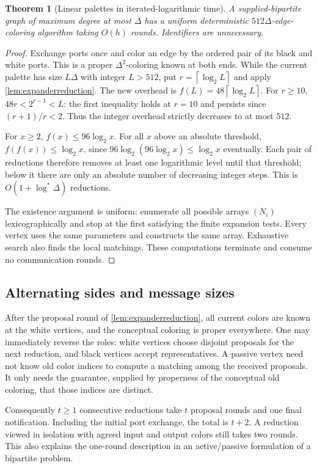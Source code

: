 \documentclass[11pt]{article}
\newtheorem{theorem}{Theorem}[section]
\theoremstyle{definition}
\theoremstyle{remark}
\newcommand{\ceil}[1]{\left\lceil #1\right\rceil}
\newcommand{\logstar}{\log^*}
\begin{document}
\begin{theorem}[Linear palettes in iterated-logarithmic time]\label{thm:linearordinary}
A supplied-bipartite graph of maximum degree at most $\Delta$ has a
uniform deterministic $512\Delta$-edge-coloring algorithm taking $O(h)$
rounds. Identifiers are unnecessary.
\end{theorem}
\begin{proof}
Exchange ports once and color an edge by the ordered pair of its black
and white ports. This is a proper $\Delta^2$-coloring known at both ends.
While the current palette has size $L\Delta$ with integer $L>512$, put
$r=\ceil{\log_2 L}$ and apply \cref{lem:expanderreduction}. The new
overhead is $f(L)=48\ceil{\log_2 L}$. For $r\ge10$,
$48r<2^{r-1}<L$: the first inequality holds at $r=10$ and persists since
$(r+1)/r<2$. Thus the integer overhead strictly decreases to at most $512$.

For $x\ge2$, $f(x)\le96\log_2 x$. For all $x$ above an absolute
threshold, $f(f(x))\le\log_2 x$, since
$96\log_2(96\log_2 x)\le\log_2 x$ eventually. Each pair of reductions
therefore removes at least one logarithmic level until that threshold;
below it there are only an absolute number of decreasing integer steps.
This is $O(1+\logstar\Delta)$ reductions.

The existence argument is uniform: enumerate all possible arrays
$(N_i)$ lexicographically and stop at the first satisfying the finite
expansion tests. Every vertex uses the same parameters and constructs
the same array. Exhaustive search also finds the local matchings. These
computations terminate and consume no communication rounds.
\end{proof}

\subsection{Alternating sides and message sizes}\label{sec:implementation}
After the proposal round of \cref{lem:expanderreduction}, all current
colors are known at the white vertices, and the conceptual coloring is
proper everywhere. One may immediately reverse the roles: white
vertices choose disjoint proposals for the next reduction, and black
vertices accept representatives. A passive vertex need not know old
color indices to compute a matching among the received proposals.
It only needs the guarantee, supplied by properness of the conceptual
old coloring, that those indices are distinct.

Consequently $t\ge1$ consecutive reductions take $t$ proposal rounds
and one final notification. Including the initial port exchange, the
total is $t+2$. A reduction viewed in isolation with agreed input and
output colors still takes two rounds. This also explains the one-round
description in an active/passive formulation of a bipartite problem.
\end{document}
